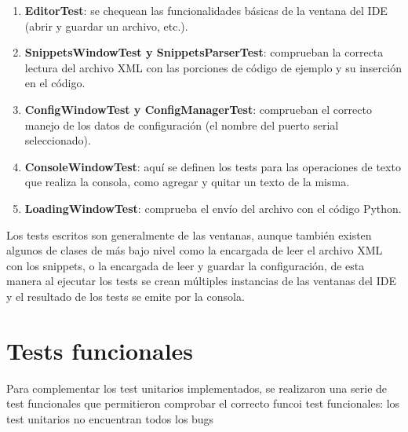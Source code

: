 \begin{enumerate}
	\item  \textbf{EditorTest}: se chequean las funcionalidades básicas de la ventana del IDE (abrir y guardar un archivo, etc.).
	\item  \textbf{SnippetsWindowTest y SnippetsParserTest}: comprueban la correcta lectura del archivo XML con las porciones de código de ejemplo y su inserción en el código.
	\item  \textbf{ConfigWindowTest y ConfigManagerTest}: comprueban el correcto manejo de los datos de configuración (el nombre del puerto serial seleccionado).
	\item  \textbf{ConsoleWindowTest}: aquí se definen los tests para las operaciones de texto que realiza la consola, como agregar y quitar un texto de la misma.
	\item  \textbf{LoadingWindowTest}: comprueba el envío del archivo con el código Python.
\end{enumerate}

Los tests escritos son generalmente de las ventanas, aunque también existen algunos de clases de más bajo nivel como la encargada de leer el archivo XML con los snippets, o la encargada de leer y guardar la configuración, de esta manera al ejecutar los tests se crean múltiples instancias de las ventanas del IDE y el resultado de los tests se emite por la consola.



\section{Tests funcionales}
\label{sec:testFuncionales}

Para complementar los test unitarios implementados, se realizaron una serie de test funcionales que permitieron comprobar el correcto funcoi
test funcionales:
los test unitarios no encuentran todos los bugs

